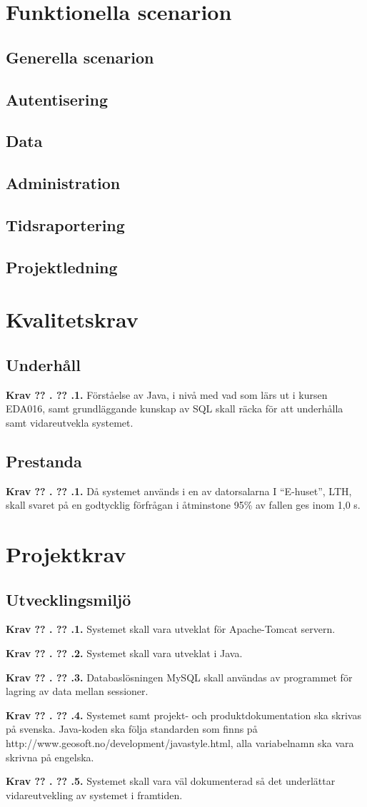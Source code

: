 \documentclass[a4paper]{article}
\newcommand\getcurrentref[1]{%
 \ifnumequal{\value{#1}}{0}
  {??}
  {\the\value{#1}}%
}
\newcommand\requirement[2]{
	\numberedrow{Krav}{#1}{#2}
}
\newcommand\numberedrow[3]{
	\noindent
	\textbf{#1 \getcurrentref{section}.\getcurrentref{subsection}.#2.} #3
	
}
\begin{document}
\section{Funktionella scenarion}
\label{scenarion}
\subsection{Generella scenarion}
\subsection{Autentisering}
\subsection{Data}
\subsection{Administration}
\subsection{Tidsraportering}
\subsection{Projektledning}
\section{Kvalitetskrav}
\subsection{Underhåll}
\requirement{1}{Förståelse av Java, i nivå med vad som lärs ut i kursen EDA016, samt grundläggande kunskap av SQL skall räcka för att underhålla samt vidareutvekla systemet.}
\subsection{Prestanda}
\requirement{1}{Då systemet används i en av datorsalarna I “E-huset”, LTH, skall svaret på en godtycklig förfrågan i åtminstone 95\% av fallen ges inom 1,0 s.}
\section{Projektkrav}
\subsection{Utvecklingsmiljö}
\requirement{1}{Systemet skall vara utveklat för Apache-Tomcat servern.}
\requirement{2}{Systemet skall vara utveklat i Java.}
\requirement{3}{Databaslösningen MySQL skall användas av programmet för lagring av data mellan sessioner.}
\requirement{4}{Systemet samt projekt- och produktdokumentation ska skrivas på svenska. Java-koden ska följa standarden som finns på http://www.geosoft.no/development/javastyle.html, alla variabelnamn ska vara skrivna på engelska.}
\requirement{5}{Systemet skall vara väl dokumenterad så det underlättar vidareutvekling av systemet i framtiden.}
\end{document}
